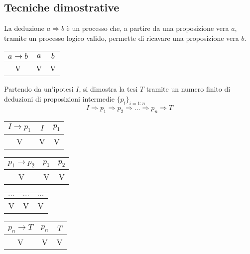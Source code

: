 \subsection{Tecniche dimostrative}
\begin{definition}[Deduzione] La deduzione $a \Rightarrow b$ è un processo che, a partire da una proposizione vera $a$, tramite un processo logico valido, permette di ricavare una proposizione vera $b$.
\end{definition}
\begin{center}
\begin{tabular}{|c|c||c|}
  \hline
  $a \rightarrow b$ & $a$ & $b$\\
  \hline
  V & V & V \\
  \hline
\end{tabular}
\end{center}


\begin{definition} Partendo da un'ipotesi $I$, si dimostra la tesi $T$ tramite un numero finito di deduzioni di proposizioni intermedie $\{p_i\}_{i=1:n}$
\begin{equation}
    I \Rightarrow p_1 \Rightarrow p_2 \Rightarrow \dots \Rightarrow p_n \Rightarrow T
\end{equation}
\end{definition}
\begin{center}
\begin{tabular}{|c|c||c|}
  \hline
  $I \rightarrow p_1$ & $I$ & $p_1$\\
  \hline
  V & V & V \\
  \hline
\end{tabular}
\end{center}
\begin{center}
\begin{tabular}{|c|c||c|}
  \hline
  $p_1 \rightarrow p_2$ & $p_1$ & $p_2$\\
  \hline
  V & V & V \\
  \hline
\end{tabular}
\end{center}
\begin{center}
\begin{tabular}{|c|c||c|}
  \hline
  $\dots$ & $\dots$ & $\dots$\\
  \hline
  V & V & V \\
  \hline
\end{tabular}
\end{center}
\begin{center}
\begin{tabular}{|c|c||c|}
  \hline
  $p_n \rightarrow T$ & $p_n$ & $T$\\
  \hline
  V & V & V \\
  \hline
\end{tabular}
\end{center}

